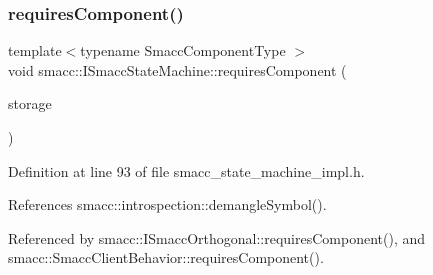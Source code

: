 \subsubsection{\texorpdfstring{requires\+Component()}{requiresComponent()}}
{\footnotesize\ttfamily template$<$typename Smacc\+Component\+Type $>$ \\
void smacc\+::\+I\+Smacc\+State\+Machine\+::requires\+Component (\begin{DoxyParamCaption}\item[{Smacc\+Component\+Type $\ast$\&}]{storage }\end{DoxyParamCaption})}



Definition at line 93 of file smacc\+\_\+state\+\_\+machine\+\_\+impl.\+h.



References smacc\+::introspection\+::demangle\+Symbol().



Referenced by smacc\+::\+I\+Smacc\+Orthogonal\+::requires\+Component(), and smacc\+::\+Smacc\+Client\+Behavior\+::requires\+Component().


